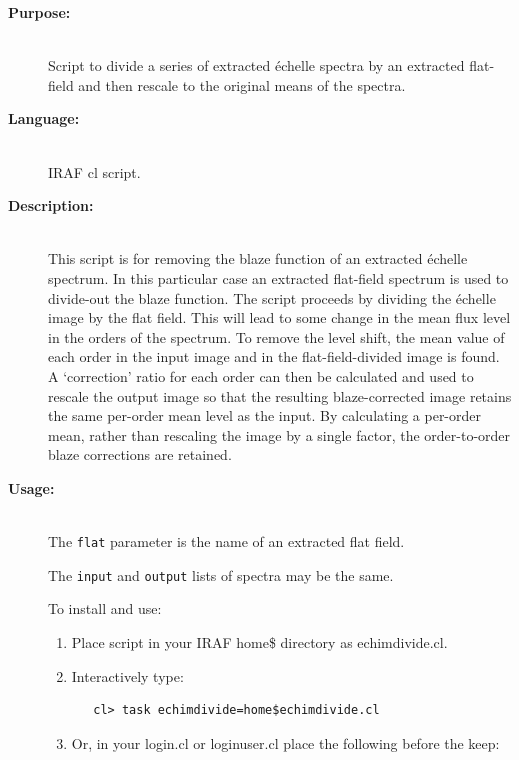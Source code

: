 \documentclass[twoside,11pt]{article}
\begin{document}
\begin{description}

\item [{\bf Purpose:}] \mbox{} \\
     Script to divide a series of extracted \'{e}chelle spectra by an
     extracted flat-field and then rescale to the original means of
     the spectra.

\item [{\bf Language:}] \mbox{} \\
     IRAF cl script.

\item [{\bf Description:}] \mbox{} \\
     This script is for removing the blaze function of an extracted
     \'{e}chelle spectrum.  In this particular case an extracted flat-field
     spectrum is used to divide-out the blaze function.
     The script proceeds by dividing the \'{e}chelle image by the flat field.
     This will lead to some change in the mean flux level in the
     orders of the spectrum.  To remove the level shift, the mean
     value of each order in the input image and in the flat-field-divided
     image is found.  A `correction' ratio for each order can then
     be calculated and used to rescale the output image so that the
     resulting blaze-corrected image retains the same per-order mean
     level as the input.  By calculating a per-order mean, rather than
     rescaling the image by a single factor, the order-to-order blaze
     corrections are retained.

\item [{\bf Usage:}] \mbox{} \\
     The \verb+flat+ parameter is the name of an extracted flat field.

     The \verb+input+ and \verb+output+ lists of spectra may be the same.

     To install and use:

\begin{enumerate}

\item Place script in your IRAF home\$ directory as echimdivide.cl.

\item Interactively type:

\begin{verbatim}
   cl> task echimdivide=home$echimdivide.cl
\end{verbatim}

\item Or, in your login.cl or loginuser.cl place the following
      before the keep:


\end{enumerate}
\end{description}
\end{document}
